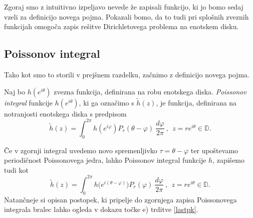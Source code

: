 \documentclass[mat1, tisk]{fmfdelo}
\begin{document}
    Zgoraj smo z intuitivno izpeljavo nevede že zapisali funkcijo, ki jo bomo sedaj vzeli za definicijo novega pojma. 
    Pokazali bomo, da to tudi pri splošnih zveznih funkcijah omogoča zapis rešitve Dirichletovega problema na enotskem disku.

\subsection{Poissonov integral}

    Tako kot smo to storili v prejšnem razdelku, začnimo z definicijo novega pojma.

    \begin{definicija}
        Naj bo $h(e^{i \theta})$ zvezna funkcija, definirana na robu enotskega diska.
        \emph{Poissonov integral} funkcije $h(e^{i\theta})$, ki ga označimo s $\widetilde{h}(z)$, je funkcija, definirana na notranjosti enotskega diska s predpisom
        $$
        \widetilde{h}(z) = \int_{0}^{2\pi}{h(e^{i\varphi}) P_r(\theta - \varphi)~\frac{d\varphi}{2 \pi}}~,~~z = r e^{i\theta} \in \mathbb{D}.
        $$
     \end{definicija}
     \begin{opomba}
        \label{kom_poiss}
        Če v zgornji integral uvedemo novo spremenljivko $\tau = \theta - \varphi$ ter upoštevamo periodičnost Poissonovega jedra, lahko Poissonov integral funkcije $h$, zapišemo tudi kot
        $$
        \widetilde{h}(z) = \int_{0}^{2\pi}{h\big(e^{i(\theta-\varphi)}\big) P_r(\varphi)~\frac{d\varphi}{2 \pi}}~,~~z = r e^{i\theta} \in \mathbb{D}.
        $$
        Natančneje si opisan postopek, ki pripelje do zgornjega zapisa Poissonovega integrala bralec lahko ogleda v dokazu točke e) trditve \ref{lastpk}.
     \end{opomba}
\end{document}
